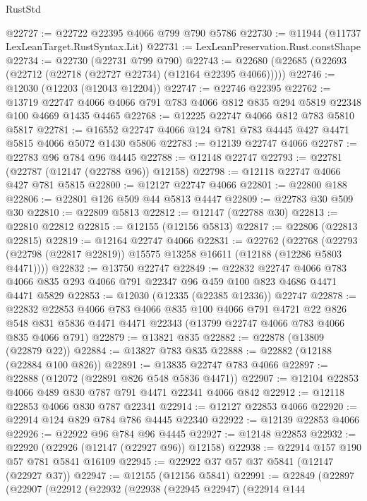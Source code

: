 \begin{lexlean}{RustStd}
\begin{coremodule}
@22727 := @22722 @22395 @4066 @799 @790 @5786
@22730 := @11944 (@11737 LexLeanTarget.RustSyntax.Lit)
@22731 := LexLeanPreservation.Rust.constShape
@22734 := @22730 (@22731 @799 @790)
@22743 := @22680 (@22685 (@22693 (@22712 (@22718 (@22727 @22734) (@12164 @22395 @4066)))))
@22746 := @12030 (@12203 (@12043 @12204))
@22747 := @22746 @22395
@22762 := @13719
    @22747
    @4066
    @4066
    @791
    @783
    @4066
    @812
    @835
    @294
    @5819
    @22348
    @100
    @4669
    @1435
    @4465
@22768 := @12225 @22747 @4066 @812 @783 @5810 @5817
@22781 := @16552 @22747 @4066 @124 @781 @783 @4445 @427 @4471 @5815 @4066 @5072 @1430 @5806
@22783 := @12139 @22747 @4066
@22787 := @22783 @96 @784 @96 @4445
@22788 := @12148 @22747
@22793 := @22781 (@22787 (@12147 (@22788 @96)) @12158)
@22798 := @12118 @22747 @4066 @427 @781 @5815
@22800 := @12127 @22747 @4066
@22801 := @22800 @188
@22806 := @22801 @126 @509 @44 @5813 @4447
@22809 := @22783 @30 @509 @30
@22810 := @22809 @5813
@22812 := @12147 (@22788 @30)
@22813 := @22810 @22812
@22815 := @12155 (@12156 @5813)
@22817 := @22806 (@22813 @22815)
@22819 := @12164 @22747 @4066
@22831 := @22762
    (@22768 (@22793 (@22798 (@22817 @22819)) @15575 @13258 @16611 (@12188 (@12286 @5803 @4471))))
@22832 := @13750 @22747
@22849 := @22832
    @22747
    @4066
    @783
    @4066
    @835
    @293
    @4066
    @791
    @22347
    @96
    @459
    @100
    @823
    @4686
    @4471
    @4471
    @5829
@22853 := @12030 (@12335 (@22385 @12336)) @22747
@22878 := @22832
    @22853
    @4066
    @783
    @4066
    @835
    @100
    @4066
    @791
    @4721
    @22
    @826
    @548
    @831
    @5836
    @4471
    @4471
    @22343
    (@13799 @22747 @4066 @783 @4066 @835 @4066 @791)
@22879 := @13821 @835
@22882 := @22878 (@13809 (@22879 @22))
@22884 := @13827 @783 @835
@22888 := @22882 (@12188 (@22884 @100 @826))
@22891 := @13835 @22747 @783 @4066
@22897 := @22888 (@12072 (@22891 @826 @548 @5836 @4471))
@22907 := @12104 @22853 @4066 @489 @830 @787 @791 @4471 @22341 @4066 @842
@22912 := @12118 @22853 @4066 @830 @787 @22341
@22914 := @12127 @22853 @4066
@22920 := @22914 @124 @829 @784 @786 @4445 @22340
@22922 := @12139 @22853 @4066
@22926 := @22922 @96 @784 @96 @4445
@22927 := @12148 @22853
@22932 := @22920 (@22926 (@12147 (@22927 @96)) @12158)
@22938 := @22914 @157 @190 @57 @781 @5841 @16109
@22945 := @22922 @37 @57 @37 @5841 (@12147 (@22927 @37))
@22947 := @12155 (@12156 @5841)
@22991 := @22849
    (@22897
      (@22907
        (@22912
          (@22932
            (@22938
              (@22945 @22947)
              (@22914
                @144

\end{coremodule}
\end{lexlean}
